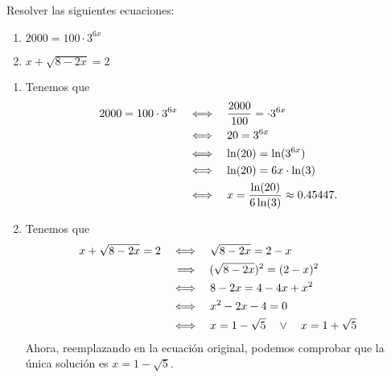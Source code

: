 \documentclass[10pt,respuestas,a4]{aleph-examen}
\begin{document}
\encabezado

\begin{preguntas}
\item
    Resolver las siguientes ecuaciones:
    \begin{multicols}{2}
        \begin{enumerate}[label=\textit{\alph*)}]
            \item
                $ 2000 = 100 \cdot 3^{6x}$
            \item
                $x+\sqrt{8-2x}=2$
        \end{enumerate}    
    \end{multicols}

\begin{respuesta}
    \begin{enumerate}[label=\textit{\alph*)},leftmargin=*]
    \item
        Tenemos que
        \begin{align*}
            2000 = 100 \cdot 3^{6x}
            & \quad\Longleftrightarrow\quad \frac{2000}{100} = \cdot 3^{6x}\\
            & \quad\Longleftrightarrow\quad 20 =  3^{6x}\\
            & \quad\Longleftrightarrow\quad \ln(20) = \ln(3^{6x})\\
            & \quad\Longleftrightarrow\quad \ln(20) = 6x\cdot\ln(3)\\
            & \quad\Longleftrightarrow\quad x = \frac{\ln(20)}{6\ln(3)} \approx 0.45447.
        \end{align*}
    \item
        Tenemos que
        \begin{align*}
            x + \sqrt{8 - 2x} = 2
            & \quad\Longleftrightarrow\quad \sqrt{8 - 2x} = 2 - x\\
            & \,\quad\Longrightarrow\quad (\sqrt{8 - 2x})^2 = (2 - x)^2\\
            & \quad\Longleftrightarrow\quad 8 - 2x = 4 - 4x + x^2\\
            & \quad\Longleftrightarrow\quad x^2 - 2x - 4 = 0\\
            & \quad\Longleftrightarrow\quad x = 1-\sqrt{5} \quad \lor \quad x = 1+\sqrt{5}
        \end{align*}
        Ahora, reemplazando en la ecuación original, podemos comprobar que la única solución es $x = 1-\sqrt{5}$.\qedhere
    \end{enumerate}
\end{respuesta}

\end{preguntas}
\end{document}
